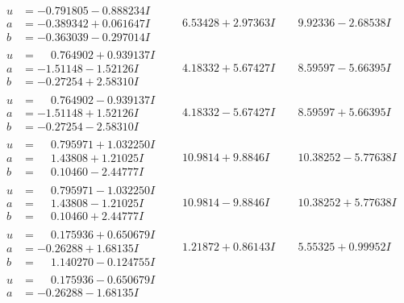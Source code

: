 \documentclass[1p]{elsarticle_modified}
\theoremstyle{definition}
\begin{document}
$$\begin{array}{c|c|c}
\begin{aligned}
u &= -0.791805 - 0.888234 I \\
a &= -0.389342 + 0.061647 I \\
b &= -0.363039 - 0.297014 I\end{aligned}
 & \phantom{-}6.53428 + 2.97363 I & \phantom{-}9.92336 - 2.68538 I \\ \hline\begin{aligned}
u &= \phantom{-}0.764902 + 0.939137 I \\
a &= -1.51148 - 1.52126 I \\
b &= -0.27254 + 2.58310 I\end{aligned}
 & \phantom{-}4.18332 + 5.67427 I & \phantom{-}8.59597 - 5.66395 I \\ \hline\begin{aligned}
u &= \phantom{-}0.764902 - 0.939137 I \\
a &= -1.51148 + 1.52126 I \\
b &= -0.27254 - 2.58310 I\end{aligned}
 & \phantom{-}4.18332 - 5.67427 I & \phantom{-}8.59597 + 5.66395 I \\ \hline\begin{aligned}
u &= \phantom{-}0.795971 + 1.032250 I \\
a &= \phantom{-}1.43808 + 1.21025 I \\
b &= \phantom{-}0.10460 - 2.44777 I\end{aligned}
 & \phantom{-}10.9814 + 9.8846 I & \phantom{-}10.38252 - 5.77638 I \\ \hline\begin{aligned}
u &= \phantom{-}0.795971 - 1.032250 I \\
a &= \phantom{-}1.43808 - 1.21025 I \\
b &= \phantom{-}0.10460 + 2.44777 I\end{aligned}
 & \phantom{-}10.9814 - 9.8846 I & \phantom{-}10.38252 + 5.77638 I \\ \hline\begin{aligned}
u &= \phantom{-}0.175936 + 0.650679 I \\
a &= -0.26288 + 1.68135 I \\
b &= \phantom{-}1.140270 - 0.124755 I\end{aligned}
 & \phantom{-}1.21872 + 0.86143 I & \phantom{-}5.55325 + 0.99952 I \\ \hline\begin{aligned}
u &= \phantom{-}0.175936 - 0.650679 I \\
a &= -0.26288 - 1.68135 I \\

\end{aligned}
\end{array}$$
\end{document}
